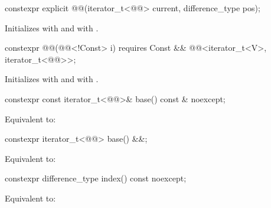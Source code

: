 %
\begin{itemdecl}
constexpr explicit @@(iterator_t<@@> current, difference_type pos);
\end{itemdecl}

\begin{itemdescr}
\pnum
\effects
Initializes  with  and
 with .
\end{itemdescr}

%
\begin{itemdecl}
constexpr @@(@@<!Const> i)
  requires Const && @@<iterator_t<V>, iterator_t<@@>>;
\end{itemdecl}

\begin{itemdescr}
\pnum
\effects
Initializes  with  and
 with .
\end{itemdescr}

%
\begin{itemdecl}
constexpr const iterator_t<@@>& base() const & noexcept;
\end{itemdecl}

\begin{itemdescr}
\pnum
\effects
Equivalent to: 
\end{itemdescr}

%
\begin{itemdecl}
constexpr iterator_t<@@> base() &&;
\end{itemdecl}

\begin{itemdescr}
\pnum
\effects
Equivalent to: 
\end{itemdescr}

%
\begin{itemdecl}
constexpr difference_type index() const noexcept;
\end{itemdecl}

\begin{itemdescr}
\pnum
\effects
Equivalent to: 
\end{itemdescr}

